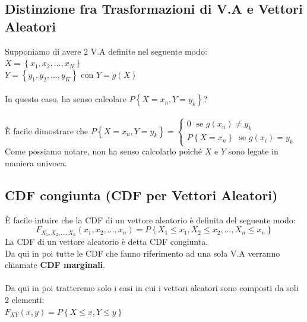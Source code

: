 \documentclass{article}
\begin{document}
\subsection{Distinzione fra Trasformazioni di V.A e Vettori Aleatori}
Supponiamo di avere 2 V.A definite nel seguente modo: \\
$X = \left\{x_1, x_2, \dots, x_N\right\}$ \\
$Y = \left\{y_1, y_2, \dots, y_K\right\}$ con $Y = g(X)$ \\ \\
In questo caso, ha senso calcolare $P \left\{X = x_n, Y=y_k\right\}$? \\ \\
È facile dimostrare che $P \left\{X = x_n, Y=y_k\right\} = 
\begin{cases}
0 \;\text{ se } g(x_n) \neq y_k \\
P \left\{X = x_n \right\} \;\text{ se } g(x_i) = y_k
\end{cases}$ \\
Come possiamo notare, non ha senso calcolarlo poiché $X$ e $Y$ sono legate in maniera univoca.

\subsection{CDF congiunta (CDF per Vettori Aleatori)}
È facile intuire che la CDF di un vettore aleatorio è definita del seguente modo:
\[F_{X_1,X_2, \dots ,X_n} \left( x_1,x_2, \dots ,x_n \right) = P \left\{ X_1 \leq x_1, X_2 \leq x_2, \dots , X_n \leq x_n\right\}\]
La CDF di un vettore aleatorio è detta CDF congiunta. \\
Da qui in poi tutte le CDF che fanno riferimento ad una sola V.A verranno chiamate \textbf{CDF marginali}. \\ \\
Da qui in poi tratteremo solo i casi in cui i vettori aleatori sono composti da soli 2 elementi: \\
$F_{XY}(x,y) = P\left\{X \leq x,Y \leq y\right\}$
\end{document}
